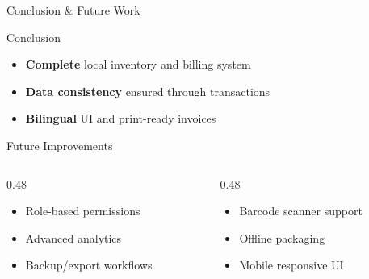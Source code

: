 \documentclass[aspectratio=169,11pt]{beamer}
\begin{document}
\begin{frame}{Conclusion \& Future Work}

\begin{block}{Conclusion}
  \begin{itemize}
    \item \textcolor{accent1}{\textbf{Complete}} local inventory and billing system
    \item \textbf{Data consistency} ensured through transactions
    \item \textbf{Bilingual} UI and print-ready invoices
  \end{itemize}
\end{block}

\vspace{0.4cm}

\begin{block}{Future Improvements}
  \begin{columns}[T]
    \begin{column}{0.48\textwidth}
      \begin{itemize}
        \item Role-based permissions
        \item Advanced analytics
        \item Backup/export workflows
      \end{itemize}
    \end{column}
    
    \begin{column}{0.48\textwidth}
      \begin{itemize}
        \item Barcode scanner support
        \item Offline packaging
        \item Mobile responsive UI
      \end{itemize}
    \end{column}
  \end{columns}
\end{block}

\end{frame}
\end{document}
